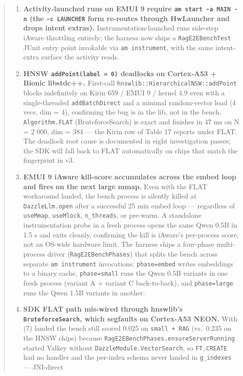 \begin{quote}
\begin{enumerate}
\item
  \textbf{Activity-launched runs on EMUI 9 require
  \texttt{am\ start\ -a\ MAIN\ -n} (the \texttt{-c\ LAUNCHER} form re-routes
  through HwLauncher and drops intent extras).} Instrumentation-launched runs
  side-step iAware throttling entirely; the harness now ships a
  \texttt{RagE2EBenchTest} JUnit entry point invokable via
  \texttt{am\ instrument}, with the same intent-extra surface the activity
  reads.
\item
  \textbf{HNSW \texttt{addPoint(label\ =\ 0)} deadlocks on Cortex-A53 + Bionic
  libstdc++.} First-call \texttt{hnswlib::HierarchicalNSW::addPoint} blocks
  indefinitely on Kirin 659 / EMUI 9 / kernel 4.9 even with a single-threaded
  \texttt{addBatchDirect} and a minimal random-vector load (4 vecs, dim = 4),
  confirming the bug is in the lib, not in the bench. \texttt{Algorithm.FLAT}
  (BruteforceSearch) is exact and finishes in 47 ms on N = 2 000, dim = 384 ---
  the Kirin row of Table 17 reports under FLAT. The deadlock root cause is
  documented in eight investigation passes; the SDK will fall back to FLAT
  automatically on chips that match the fingerprint in v3.
\item
  \textbf{EMUI 9 iAware kill-score accumulates across the embed loop and fires
  on the next large mmap.} Even with the FLAT workaround landed, the bench
  process is silently killed at \texttt{DazzleLlm.open} after a successful 25
  min embed loop --- regardless of \texttt{useMmap}, \texttt{useMlock},
  \texttt{n\_threads}, or pre-warm. A standalone instrumentation probe in a
  fresh process opens the same Qwen 0.5B in 1.5 s and exits cleanly, confirming
  the kill is iAware's per-process score, not an OS-wide hardware limit. The
  harness ships a four-phase multi-process driver (\texttt{RagE2EBenchPhases})
  that splits the bench across separate \texttt{am\ instrument} invocations:
  \texttt{phase=embed} writes embeddings to a binary cache, \texttt{phase=small}
  runs the Qwen 0.5B variants in one fresh process (variant A + variant C
  back-to-back), and \texttt{phase=large} runs the Qwen 1.5B variants in
  another.
\item
  \textbf{SDK FLAT path mis-wired through hnswlib's \texttt{BruteforceSearch},
  which segfaults on Cortex-A53 NEON.} With (7) landed the bench still scored
  0.025 on \texttt{small\ +\ RAG} (vs.~0.235 on the HNSW chips) because
  \texttt{RagE2EBenchPhases.ensureServerRunning} started Valkey without
  \texttt{DazzleModule.VectorSearch}, so \texttt{FT.CREATE} had no handler and
  the per-index schema never landed in \texttt{g\_indexes} --- JNI-direct

\end{enumerate}
\end{quote}
